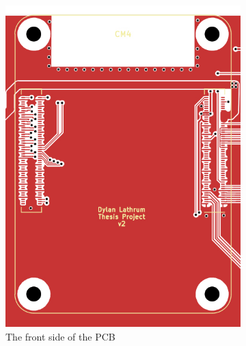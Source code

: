 \begin{figure}[b!]
  \centering
  \begin{subfigure}{.33\textwidth}
    \centering
    \includegraphics[width=.95\linewidth]{Figures/kicad/close-ups/cm4-front}
    \caption{The front side of the PCB}
    \label{fig:CM4CircuitFront}
  \end{subfigure}%
  \begin{subfigure}{.33\textwidth}
    \centering

\end{subfigure}
\end{figure}
